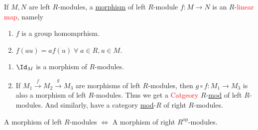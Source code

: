 \begin{definition}
	If \( M, N \) are left \( R \)-modules, a \underline{morphism} of left \( R \)-module \( f: M \to
	N\) is an \( R \)-\textcolor{red}{linear map}, namely
	\begin{enumerate}
		\item \( f \) is a group homomprhism.
		\item \( f(au) = af(u) \; \forall \; a\in R, u\in M \).
	\end{enumerate}
\end{definition}

\begin{remark}
	\leavevmode
	\begin{enumerate}
		\item \( \Id_{M} \) is a morphism of \( R \)-modules.
		\item If \( M_1 \xrightarrow{f}M_2 \xrightarrow{g}M_3 \) are morphisms of left \( R \)-modules,
		      then \( g\circ f: M_1 \to M_3 \) is also a morphism of left \( R \)-modules. Thus we get a
		      \textcolor{red}{Catgeory} \( R \)-\underline{mod} of left \( R \)-modules. And similarly, have
		      a category \underline{mod}-\( R \) of right \( R \)-modules.
	\end{enumerate}
\end{remark}

\begin{note}
	A morphism of left \( R \)-modules \( \iff \) A morphism of right \( R^{\text{op}} \)-modules.
\end{note}

